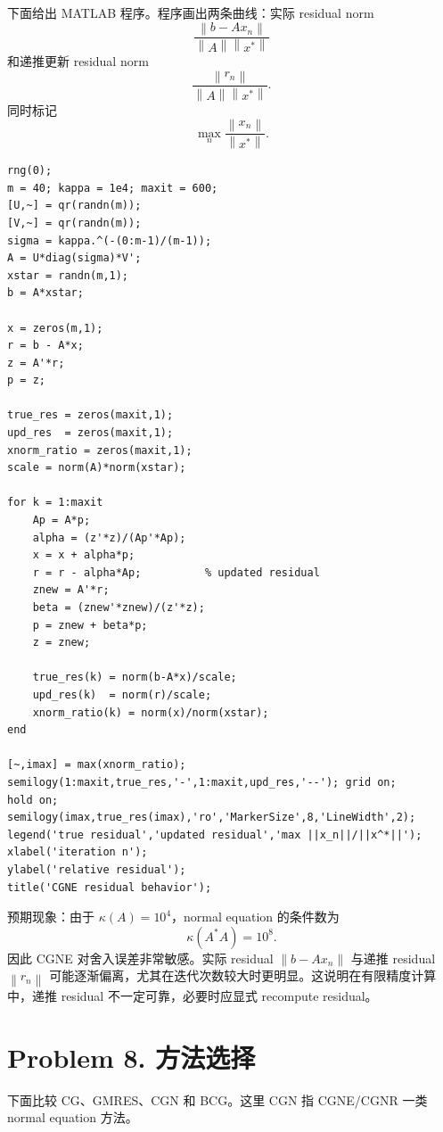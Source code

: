 \documentclass[11pt]{ctexart}
\newcommand{\norm}[1]{\left\lVert #1 \right\rVert}
\begin{document}
下面给出 MATLAB 程序。程序画出两条曲线：实际 residual norm
\[
\frac{\norm{b-Ax_n}}{\norm{A}\norm{x^*}}
\]
和递推更新 residual norm
\[
\frac{\norm{r_n}}{\norm{A}\norm{x^*}}.
\]
同时标记
\[
\max_n \frac{\norm{x_n}}{\norm{x^*}}.
\]

\begin{lstlisting}
rng(0);
m = 40; kappa = 1e4; maxit = 600;
[U,~] = qr(randn(m));
[V,~] = qr(randn(m));
sigma = kappa.^(-(0:m-1)/(m-1));
A = U*diag(sigma)*V';
xstar = randn(m,1);
b = A*xstar;

x = zeros(m,1);
r = b - A*x;
z = A'*r;
p = z;

true_res = zeros(maxit,1);
upd_res  = zeros(maxit,1);
xnorm_ratio = zeros(maxit,1);
scale = norm(A)*norm(xstar);

for k = 1:maxit
    Ap = A*p;
    alpha = (z'*z)/(Ap'*Ap);
    x = x + alpha*p;
    r = r - alpha*Ap;          % updated residual
    znew = A'*r;
    beta = (znew'*znew)/(z'*z);
    p = znew + beta*p;
    z = znew;

    true_res(k) = norm(b-A*x)/scale;
    upd_res(k)  = norm(r)/scale;
    xnorm_ratio(k) = norm(x)/norm(xstar);
end

[~,imax] = max(xnorm_ratio);
semilogy(1:maxit,true_res,'-',1:maxit,upd_res,'--'); grid on;
hold on;
semilogy(imax,true_res(imax),'ro','MarkerSize',8,'LineWidth',2);
legend('true residual','updated residual','max ||x_n||/||x^*||');
xlabel('iteration n');
ylabel('relative residual');
title('CGNE residual behavior');
\end{lstlisting}

预期现象：由于 $\kappa(A)=10^4$，normal equation 的条件数为
\[
\kappa(A^*A)=10^8.
\]
因此 CGNE 对舍入误差非常敏感。实际 residual $\norm{b-Ax_n}$ 与递推 residual $\norm{r_n}$ 可能逐渐偏离，尤其在迭代次数较大时更明显。这说明在有限精度计算中，递推 residual 不一定可靠，必要时应显式 recompute residual。

\section*{Problem 8. 方法选择}

下面比较 CG、GMRES、CGN 和 BCG。这里 CGN 指 CGNE/CGNR 一类 normal equation 方法。
\end{document}
